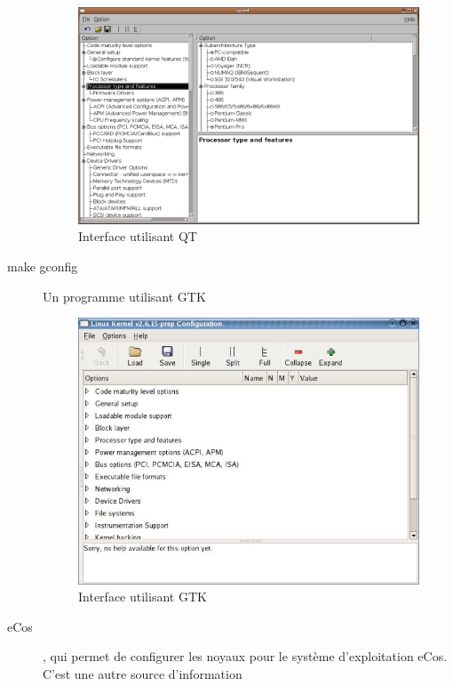 \documentclass[16pts]{report}
\begin{document}
\begin{description}
\begin{figure}[H]
            \includegraphics[scale=0.4]{illustrations/xconfig.png}
            \centering
            \caption{Interface utilisant QT}
            \label{fig:MakeXconfig}
        \end{figure}
        \pagebreak
\item[make gconfig]             Un programme utilisant GTK \\
        \begin{figure}[H]
            \includegraphics[scale=0.9]{illustrations/gconfig.jpg}
            \centering
            \caption{Interface utilisant GTK}
            \label{fig:MakeGconfig}
        \end{figure}
    \item[eCos], qui permet de configurer les noyaux pour le système
        d’exploitation eCos. C’est une autre source d’information

\end{description}
\end{document}
